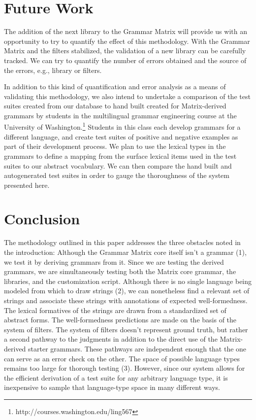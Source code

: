 \documentclass[11pt]{article}
\begin{document}
\section{Future Work}

The addition of the next library to the Grammar Matrix will provide
us with an opportunity to try to quantify the effect of this
methodology.  With the Grammar Matrix and the filters stabilized, the
validation of a new library can be carefully tracked.  We can try to
quantify the number of errors obtained and the source of the errors,
e.g., library or filters.

In addition to this kind of quantification and error analysis as a
means of validating this methodology, we also intend to undertake a
comparison of the test suites created from our database to hand built
created for Matrix-derived grammars by students in the multilingual
grammar engineering course at the University of
Washington.\footnote{http://courses.washington.edu/ling567} Students
in this class each develop grammars for a different language, and
create test suites of positive and negative examples as part of their
development process.  We plan to use the lexical types in the grammars
to define a mapping from the surface lexical items used in the test
suites to our abstract vocabulary.  We can then compare the hand built
and autogenerated test suites in order to gauge the thoroughness of
the system presented here.

\section{Conclusion}

The methodology outlined in this paper addresses the three obstacles
noted in the introduction:  Although the Grammar Matrix core
itself isn't a grammar (1), we test it by deriving grammars from it. Since we
are testing the derived grammars, we are simultaneously testing both
the Matrix core grammar, the libraries, and the customization script.
Although there is no single language being modeled from which to
draw strings (2), we can nonetheless find a relevant set of strings and
associate these strings with annotations of expected well-formedness.  The
lexical formatives of the strings are drawn from a standardized set
of abstract forms.  The well-formedness predictions are made on the basis
of the system of filters.  The system of filters doesn't represent
ground truth, but rather a second pathway to the judgments in 
addition to the direct use of the Matrix-derived starter grammars.
These pathways are independent enough that the one can serve as an
error check on the other.  The space of possible language types
remains too large for thorough testing (3).  However, since our system allows
for the efficient derivation of a test suite for any arbitrary
language type, it is inexpensive to sample that language-type space in
many different ways.
\end{document}
